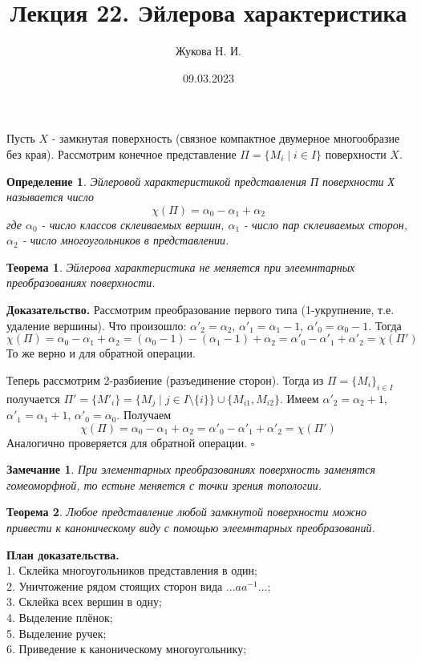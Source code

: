 \documentclass[a4paper]{article}
\author{Жукова Н. И.}
\title{Лекция 22. Эйлерова характеристика}
\date{09.03.2023}
\newtheorem{defin}{Определение}
\newtheorem{zam}{Замечание}
\newtheorem{theor}{Теорема}
\begin{document}
\maketitle
Пусть $X$ - замкнутая поверхность (связное компактное двумерное многообразие
без края). Рассмотрим конечное представление $\Pi = \{M_i\mid i \in I\}$ 
поверхности $X$.
\begin{defin}
Эйлеровой характеристикой представления П поверхности Х называется
число 
$$\chi(\Pi) = \alpha_0-\alpha_1+\alpha_2$$
где $\alpha_0$ - число классов склеиваемых вершин, $\alpha_1$ - число 
пар склеиваемых сторон, $\alpha_2$ - число многоугольников в представлении.
\end{defin}
\begin{theor}\label{euler}
 Эйлерова характеристика не меняется при элеемнтарных преобразованиях 
 поверхности.
 \end{theor}
 \textbf{Доказательство.} 
 Рассмотрим преобразование первого типа (1-укрупнение, т.е. удаление вершины).
 Что произошло:
$\alpha'_2 = \alpha_2$, $\alpha'_1 = \alpha_1 - 1$, $\alpha'_0 = 
\alpha_0-1$. Тогда
$$\chi(\Pi) = \alpha_0-\alpha_1+\alpha_2 = (\alpha_0-1) - (\alpha_1-1)+
\alpha_2 = 
\alpha'_0 - \alpha'_1 + \alpha'_2 = \chi(\Pi')
$$
То же верно и для обратной операции.

Теперь рассмотрим 2-разбиение (разъединение сторон). 
Тогда из $\Pi = \{M_i\}_{i\in I}$ получается
$\Pi' = \{M'_i\} = \{M_j\mid j\in I\setminus \{i\} \}\cup \{M_{i1},M_{i2}\}$.
Имеем 
$\alpha'_2 = \alpha_2+1$, $\alpha'_1 = \alpha_1 + 1$, $\alpha'_0 = \alpha_0$.
Получаем
$$\chi(\Pi) = \alpha_0-\alpha_1+\alpha_2 =
\alpha'_0 - \alpha'_1 + \alpha'_2 = \chi(\Pi')$$
Аналогично проверяется для обратной операции. 
$\square$ 
\begin{zam}
    При элементарных преобразованиях поверхность заменятся гомеоморфной,
    то естьне меняется с точки зрения топологии.
\end{zam}
\begin{theor}
Любое представление любой замкнутой поверхности можно привести 
к каноническому виду с помощью элеемнтарных преобразований.
\end{theor}
\textbf{План доказательства.}\\
1. Склейка многоугольников представления в один;\\
2. Уничтожение рядом стоящих сторон вида $...aa^{-1}...$;\\
3. Склейка всех вершин в одну;\\
4. Выделение плёнок;\\
5. Выделение ручек;\\
6. Приведение к каноническому многоугольнику;
\end{document}
